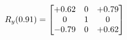 \documentclass[preview]{standalone}
\begin{document}
\begin{align*}
\special{dvisvgm:raw <g id='unique000'>}R_{y}(0.91) = \begin{bmatrix}+0.62 & 0 & +0.79 \\0 & 1 & 0 \\-0.79 & 0 & +0.62\end{bmatrix}\special{dvisvgm:raw </g>}
\end{align*}
\end{document}
